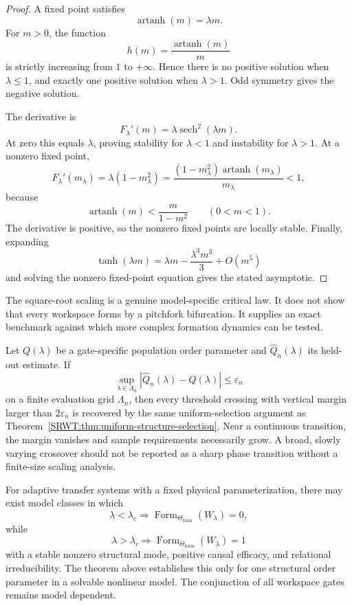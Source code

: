 \begin{proof}
A fixed point satisfies
\[
\operatorname{artanh}(m)=\lambda m.
\]
For \(m>0\), the function
\[
h(m)=\frac{\operatorname{artanh}(m)}{m}
\]
is strictly increasing from \(1\) to \(+\infty\). Hence there is no positive
solution when \(\lambda\leq1\), and exactly one positive solution when
\(\lambda>1\). Odd symmetry gives the negative solution.

The derivative is
\[
F_\lambda'(m)
=
\lambda\operatorname{sech}^2(\lambda m).
\]
At zero this equals \(\lambda\), proving stability for \(\lambda<1\) and
instability for \(\lambda>1\). At a nonzero fixed point,
\[
F_\lambda'(m_\lambda)
=
\lambda(1-m_\lambda^2)
=
\frac{(1-m_\lambda^2)\operatorname{artanh}(m_\lambda)}{m_\lambda}
<1,
\]
because
\[
\operatorname{artanh}(m)
<
\frac{m}{1-m^2}
\qquad(0<m<1).
\]
The derivative is positive, so the nonzero fixed points are locally stable.
Finally, expanding
\[
\tanh(\lambda m)
=
\lambda m-
\frac{\lambda^3m^3}{3}
+O(m^5)
\]
and solving the nonzero fixed-point equation gives the stated asymptotic.
\end{proof}

The square-root scaling is a genuine model-specific critical law. It does not
show that every workspace forms by a pitchfork bifurcation. It supplies an
exact benchmark against which more complex formation dynamics can be tested.


Let \(Q(\lambda)\) be a gate-specific population order parameter and
\(\widehat Q_n(\lambda)\) its held-out estimate. If
\[
\sup_{\lambda\in\Lambda_n}
|\widehat Q_n(\lambda)-Q(\lambda)|
\leq\varepsilon_n
\]
on a finite evaluation grid \(\Lambda_n\), then every threshold crossing with
vertical margin larger than \(2\varepsilon_n\) is recovered by the same
uniform-selection argument as Theorem~\ref{SRWT:thm:uniform-structure-selection}.
Near a continuous transition, the margin vanishes and sample requirements
necessarily grow. A broad, slowly varying crossover should not be reported as
a sharp phase transition without a finite-size scaling analysis.


For adaptive transfer systems with a fixed physical parameterization, there
may exist model classes in which
\[
\lambda<\lambda_c
\Longrightarrow
\operatorname{Form}_{\Theta_{\mathrm{form}}}(W_\lambda)=0,
\]
while
\[
\lambda>\lambda_c
\Longrightarrow
\operatorname{Form}_{\Theta_{\mathrm{form}}}(W_\lambda)=1
\]
with a stable nonzero structural mode, positive causal efficacy, and
relational irreducibility. The theorem above establishes this only for one
structural order parameter in a solvable nonlinear model. The conjunction of
all workspace gates remains model dependent.


